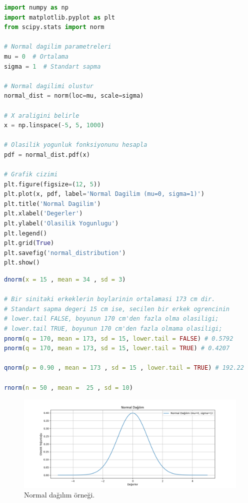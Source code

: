 \begin{lstlisting}[language=Python]
import numpy as np
import matplotlib.pyplot as plt
from scipy.stats import norm

# Normal dagilim parametreleri
mu = 0  # Ortalama
sigma = 1  # Standart sapma

# Normal dagilimi olustur
normal_dist = norm(loc=mu, scale=sigma)

# X araligini belirle
x = np.linspace(-5, 5, 1000)

# Olasilik yogunluk fonksiyonunu hesapla
pdf = normal_dist.pdf(x)

# Grafik cizimi
plt.figure(figsize=(12, 5))
plt.plot(x, pdf, label='Normal Dagilim (mu=0, sigma=1)')
plt.title('Normal Dagilim')
plt.xlabel('Degerler')
plt.ylabel('Olasilik Yogunlugu')
plt.legend()
plt.grid(True)
plt.savefig('normal_distribution')
plt.show()
\end{lstlisting}

\begin{lstlisting}[language=R]
dnorm(x = 15 , mean = 34 , sd = 3)

# Bir sinitaki erkeklerin boylarinin ortalamasi 173 cm dir.
# Standart sapma degeri 15 cm ise, secilen bir erkek ogrencinin
# lower.tail FALSE, boyunun 170 cm'den fazla olma olasiligi;
# lower.tail TRUE, boyunun 170 cm'den fazla olmama olasiligi;
pnorm(q = 170, mean = 173, sd = 15, lower.tail = FALSE) # 0.5792
pnorm(q = 170, mean = 173, sd = 15, lower.tail = TRUE) # 0.4207

qnorm(p = 0.90 , mean = 173 , sd = 15 , lower.tail = TRUE) # 192.22

rnorm(n = 50 , mean =  25 , sd = 10)
\end{lstlisting}

\newpage

\begin{figure}[h]
    \centering
    \includegraphics[width=1\textwidth]{images/normal_distribution.png}
    \caption{Normal dağılım örneği.}
    \label{fig:enter-label}
\end{figure}

